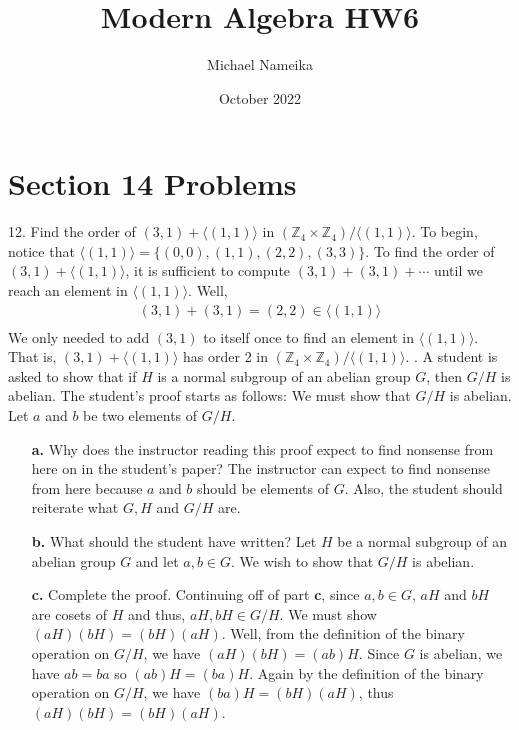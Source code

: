 \documentclass{article}
\title{Modern Algebra HW6}
\author{Michael Nameika}
\date{October 2022}
\begin{document}
\maketitle

\section*{Section 14 Problems}
12. Find the order of $(3,1) + \langle (1,1) \rangle$ in $(\mathbb{Z}_4 \times \mathbb{Z}_4)/\langle (1,1) \rangle$.
\newline\newline
To begin, notice that $\langle (1,1) \rangle = \{(0,0), (1,1), (2,2), (3,3)\}$. To find the order of $(3,1) + \langle (1,1) \rangle$, it is sufficient to compute $(3,1) + (3,1) + \cdots$ until we reach an element in  $\langle (1,1) \rangle$. Well,
\begin{align*}
    (3,1) + (3,1) = (2,2) \in \langle (1,1) \rangle \\
\end{align*}
We only needed to add $(3,1)$ to itself once to find an element in $\langle (1,1) \rangle$. That is, $(3,1) + \langle (1,1) \rangle$ has order 2 in $(\mathbb{Z}_4 \times \mathbb{Z}_4)/\langle (1,1) \rangle$.
\newline{}. A student is asked to show that if $H$ is a normal subgroup of an abelian group $G$, then $G/H$ is abelian. The student's proof starts as follows:
\newline
We must show that $G/H$ is abelian. Let $a$ and $b$ be two elements of $G/H$.
\begin{enumerate}
    \item[\textbf{a.}] Why does the instructor reading this proof expect to find nonsense from here on in the student's paper?
    \newline{}
    The instructor can expect to find nonsense from here because $a$ and $b$ should be elements of $G$. Also, the student should reiterate what $G,H$ and $G/H$ are. 
    \newline
    \item[\textbf{b.}] What should the student have written?
    \newline\newline
    Let $H$ be a normal subgroup of an abelian group $G$ and let $a,b \in G$. We wish to show that $G/H$ is abelian. 
    \newline
    \item[\textbf{c.}] Complete the proof.
    \newline\newline
    Continuing off of part \textbf{c}, since $a,b \in G$, $aH$ and $bH$ are cosets of $H$ and thus, $aH, bH \in G/H$. We must show $(aH)(bH) = (bH)(aH)$. Well, from the definition of the binary operation on $G/H$, we have $(aH)(bH) = (ab)H$. Since $G$ is abelian, we have $ab = ba$ so $(ab)H = (ba)H$. Again by the definition of the binary operation on $G/H$, we have $(ba)H = (bH)(aH)$, thus $(aH)(bH) = (bH)(aH)$.
\end{enumerate}
\end{document}

